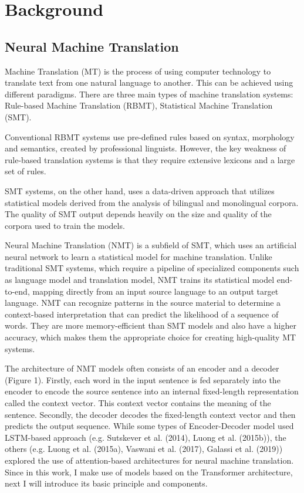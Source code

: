 \chapter{Background}
\label{ch:Background}


\section{Neural Machine Translation}
\label{sec:Background:NMT}

Machine Translation (MT) is the process of using computer technology to translate text from one natural language to another. This can be achieved using different paradigms. There are three main types of machine translation systems: Rule-based Machine Translation (RBMT), Statistical Machine Translation (SMT). 

Conventional RBMT systems use pre-defined rules based on syntax, morphology and semantics, created by professional linguists. However, the key weakness of rule-based translation systems is that they require extensive lexicons and a large set of rules. 

SMT systems, on the other hand, uses a data-driven approach that utilizes statistical models derived from the analysis of bilingual and monolingual corpora. The quality of SMT output depends heavily on the size and quality of the corpora used to train the models.

Neural Machine Translation (NMT) is a subfield of SMT, which uses an artificial neural network to learn a statistical model for machine translation. Unlike traditional SMT systems, which require a pipeline of specialized components such as language model and translation model, NMT trains its statistical model end-to-end, mapping directly from an input source language to an output target language. NMT can recognize patterns in the source material to determine a context-based interpretation that can predict the likelihood of a sequence of words. They are more memory-efficient than SMT models and also have a higher accuracy, which makes them the appropriate choice for creating high-quality MT systems.

The architecture of NMT models often consists of an encoder and a decoder
(Figure 1). Firstly, each word in the input sentence is fed separately into the
encoder to encode the source sentence into an internal fixed-length representation
called the context vector. This context vector contains the meaning of the sentence.
Secondly, the decoder decodes the fixed-length context vector and then predicts
the output sequence. While some types of Encoder-Decoder model used LSTM-based
approach (e.g. Sutskever et al. (2014), Luong et al. (2015b)), the others (e.g.
Luong et al. (2015a), Vaswani et al. (2017), Galassi et al. (2019)) explored the use of attention-based architectures for neural machine translation. Since in this work, I make use of models based on the Transformer architecture, next I will introduce its basic principle and components.

